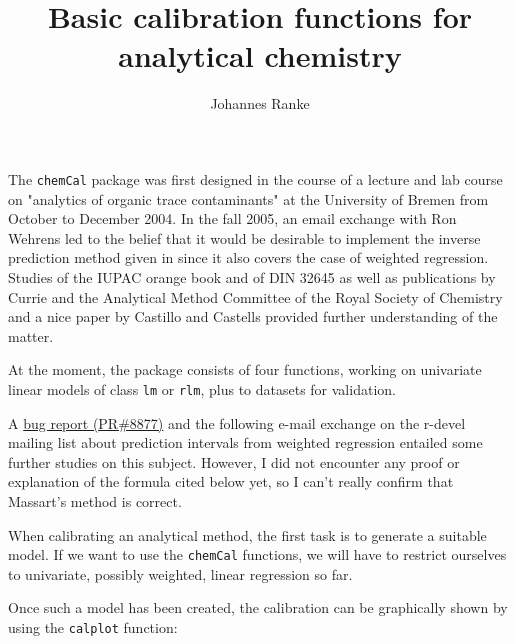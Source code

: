\documentclass[a4paper]{article}
\title{Basic calibration functions for analytical chemistry}
\author{Johannes Ranke}
\begin{document}
\maketitle

The \texttt{chemCal} package was first designed in the course of a lecture and lab
course on "analytics of organic trace contaminants" at the University of Bremen
from October to December 2004. In the fall 2005, an email exchange with 
Ron Wehrens led to the belief that it would be desirable to implement the
inverse prediction method given in \cite{massart97} since it also covers the
case of weighted regression. Studies of the IUPAC orange book and of DIN 32645
as well as publications by Currie and the Analytical Method Committee of the 
Royal Society of Chemistry and a nice paper by Castillo and Castells provided
further understanding of the matter.

At the moment, the package consists of four functions, working on univariate
linear models of class \texttt{lm} or \texttt{rlm}, plus to datasets for
validation.

A \href{http://bugs.r-project.org/cgi-bin/R/wishlst-fulfilled?id=8877;user=guest}{bug
report (PR\#8877)} and the following e-mail exchange on the r-devel mailing list about
prediction intervals from weighted regression entailed some further studies
on this subject. However, I did not encounter any proof or explanation of the
formula cited below yet, so I can't really confirm that Massart's method is correct.

When calibrating an analytical method, the first task is to generate a suitable
model. If we want to use the \texttt{chemCal} functions, we will have to restrict
ourselves to univariate, possibly weighted, linear regression so far.

Once such a model has been created, the calibration can be graphically
shown by using the \texttt{calplot} function:
\end{document}

